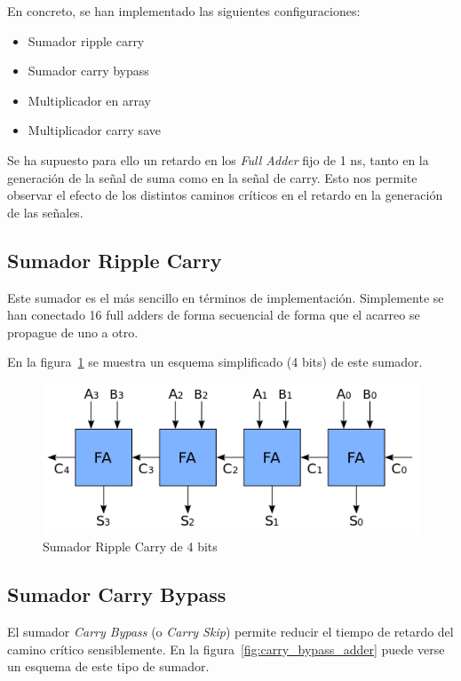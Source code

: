 \documentclass[a4paper,12pt]{article}
\begin{document}
En concreto, se han implementado las siguientes configuraciones:
\begin{itemize}
\item Sumador ripple carry
\item Sumador carry bypass
\item Multiplicador en array
\item Multiplicador carry save
\end{itemize}

Se ha supuesto para ello un retardo en los \emph{Full Adder} fijo de 1 ns, tanto en la generación de la señal de suma como en la señal de carry. Esto nos permite observar el efecto de los distintos caminos críticos en el retardo en la generación de las señales.

\subsection{Sumador Ripple Carry}
Este sumador es el más sencillo en términos de implementación. Simplemente se han conectado 16 full adders de forma secuencial de forma que el acarreo se propague de uno a otro.

En la figura~\ref{fig:ripple_carry_adder} se muestra un esquema simplificado (4 bits) de este sumador.

\begin{figure}[hbt]
\includegraphics[width=\textwidth]{img/ripple_carry_adder.png} 
\caption{Sumador Ripple Carry de 4 bits} \label{fig:ripple_carry_adder}
\end{figure}

\subsection{Sumador Carry Bypass}
El sumador \emph{Carry Bypass} (o \emph{Carry Skip}) permite reducir el tiempo de retardo del camino crítico sensiblemente. En la figura~\ref{fig:carry_bypass_adder} puede verse un esquema de este tipo de sumador.
\end{document}
